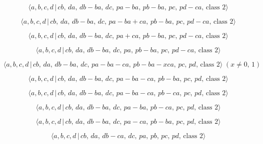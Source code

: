 \documentclass[10pt]{article}
\begin{document}
\begin{equation}
\langle a,b,c,d\,|\,cb,\,da,\,db-ba,\,dc,\,pa-ba,\,pb-ba,\,pc,\,pd-ca,\,%
\text{class }2\rangle  \tag{6.39B}
\end{equation}

\begin{equation}
\langle a,b,c,d\,|\,cb,\,da,\,db-ba,\,dc,\,pa-ba+ca,\,pb-ba,\,pc,\,pd-ca,\,%
\text{class }2\rangle  \tag{6.40}
\end{equation}

\begin{equation}
\langle a,b,c,d\,|\,cb,\,da,\,db-ba,\,dc,\,pa+ca,\,pb-ba,\,pc,\,pd-ca,\,%
\text{class }2\rangle  \tag{6.41}
\end{equation}

\begin{equation}
\langle a,b,c,d\,|\,cb,\,da,\,db-ba,\,dc,\,pa,\,pb-ba,\,pc,\,pd-ca,\,\text{
class }2\rangle  \tag{6.42}
\end{equation}

\begin{equation}
\langle a,b,c,d\,|\,cb,\,da,\,db-ba,\,dc,\,pa-ba-ca,\,pb-ba-xca,\,pc,\,pd,\,%
\text{class }2\rangle\;(x \neq 0,\,1)  \tag{6.43}
\end{equation}

\begin{equation}
\langle a,b,c,d\,|\,cb,\,da,\,db-ba,\,dc,\,pa-ba-ca,\,pb-ba,\,pc,\,pd,\,%
\text{class }2\rangle  \tag{6.44}
\end{equation}

\begin{equation}
\langle a,b,c,d\,|\,cb,\,da,\,db-ba,\,dc,\,pa-ba-ca,\,pb-ca,\,pc,\,pd,\,%
\text{class }2\rangle  \tag{6.45}
\end{equation}

\begin{equation}
\langle a,b,c,d\,|\,cb,\,da,\,db-ba,\,dc,\,pa-ba,\,pb-ca,\,pc,\,pd,\,\text{
class }2\rangle  \tag{6.46}
\end{equation}

\begin{equation}
\langle a,b,c,d\,|\,cb,\,da,\,db-ba,\,dc,\,pa-ca,\,pb-ba,\,pc,\,pd,\,\text{
class }2\rangle  \tag{6.47}
\end{equation}

\begin{equation}
\langle a,b,c,d\,|\,cb,\,da,\,db-ca,\,dc,\,pa,\,pb,\,pc,\,pd,\,\text{class }%
2\rangle  \tag{6.48}
\end{equation}
\end{document}

